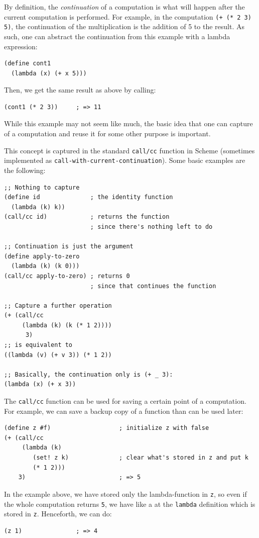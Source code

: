 By definition, the \emph{continuation} of a computation is what will happen
after the current computation is performed. For example, in the computation
\texttt{(+ (* 2 3) 5)}, the continuation of the multiplication is the addition
of 5 to the result. As such, one can abstract the continuation from this example
with a lambda expression:
{\small
\begin{verbatim}
(define cont1
  (lambda (x) (+ x 5)))
\end{verbatim}
}
Then, we get the same result as above by calling:
{\small
\begin{verbatim}
(cont1 (* 2 3))     ; => 11
\end{verbatim}
}
While this example may not seem like much, the basic idea that one can capture
 of a computation and reuse it for some other purpose is important.

This concept is captured in the standard \texttt{call/cc} function in Scheme
(sometimes implemented as \texttt{call-with-current-continuation}). Some basic
examples are the following:
{
  \small
\begin{verbatim}
;; Nothing to capture
(define id              ; the identity function
  (lambda (k) k))
(call/cc id)            ; returns the function
                        ; since there's nothing left to do

;; Continuation is just the argument
(define apply-to-zero
  (lambda (k) (k 0)))
(call/cc apply-to-zero) ; returns 0
                        ; since that continues the function

;; Capture a further operation
(+ (call/cc 
     (lambda (k) (k (* 1 2))))
      3)
;; is equivalent to
((lambda (v) (+ v 3)) (* 1 2))

;; Basically, the continuation only is (+ _ 3):
(lambda (x) (+ x 3))
\end{verbatim}
}

The \texttt{call/cc} function can be used for saving a certain point
of a computation. For example, we can save a backup copy of a function
than can be used later:
{
  \small
\begin{verbatim}
(define z #f)                   ; initialize z with false
(+ (call/cc
     (lambda (k)
        (set! z k)              ; clear what's stored in z and put k
        (* 1 2)))
    3)                          ; => 5
\end{verbatim}
}
In the example above, we have stored only the lambda-function in \texttt{z},
so even if the whole computation returns \texttt{5}, we have like a
 at the \texttt{lambda} definition which is stored in \texttt{z}.
Henceforth, we can do:
{
  \small
\begin{verbatim}
(z 1)               ; => 4
\end{verbatim}
}

